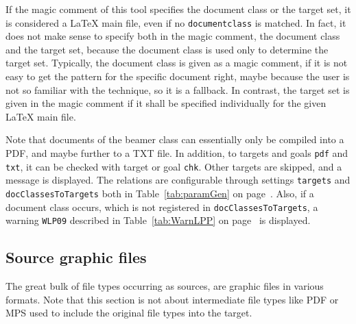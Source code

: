 If the magic comment of this tool specifies the document class or the target set, 
it is considered a \LaTeX{} main file, even if no \texttt{documentclass} is matched. 
In fact, it does not make sense to specify both in the magic comment, 
the document class and the target set, 
because the document class is used only to determine the target set. 
Typically, the document class is given as a magic comment, 
if it is not easy to get the pattern for the specific document right, 
maybe because the user is not so familiar with the technique, so it is a fallback. 
In contrast, the target set is given in the magic comment 
if it shall be specified individually for the given \LaTeX{} main file. 


Note that documents of the beamer class can essentially only be compiled into a PDF, 
and maybe further to a TXT file. 
In addition, to targets and goals \texttt{pdf} and \texttt{txt}, 
it can be checked with target or goal \texttt{chk}. 
Other targets are skipped, and a message is displayed. 
The relations are configurable 
through settings \texttt{targets} and \texttt{docClassesToTargets} 
both in Table~\ref{tab:paramGen} on page~\pageref{tab:paramGen}. 
Also, if a document class occurs, 
which is not registered in \texttt{docClassesToTargets}, 
a warning \texttt{WLP09} described in Table~\ref{tab:WarnLPP} 
on page~\pageref{tab:WarnLPP} is displayed. 






\subsection{Source graphic files}\label{subsec:sourcesGraphic}

The great bulk of file types occurring as sources, 
are graphic files in various formats. 
Note that this section is not about intermediate file types like PDF or MPS 
used to include the original file types into the target. 

